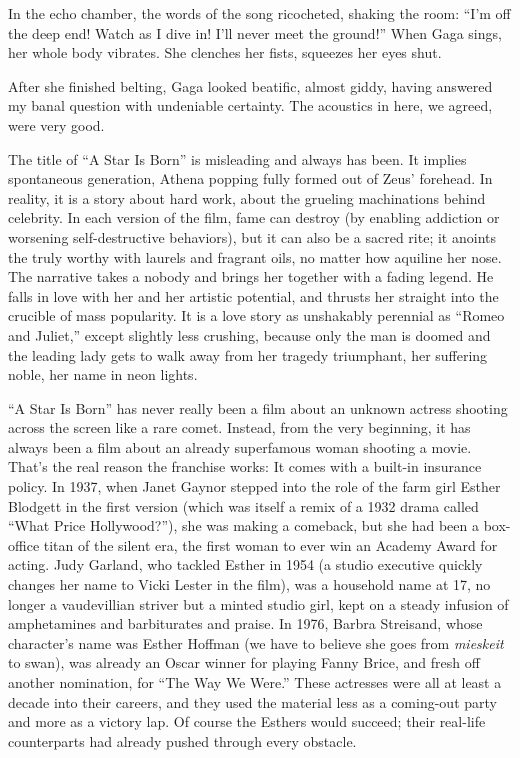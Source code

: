 In the echo chamber, the words of the song ricocheted, shaking the room:
``I'm off the deep end! Watch as I dive in! I'll never meet the
ground!'' When Gaga sings, her whole body vibrates. She clenches her
fists, squeezes her eyes shut.

After she finished belting, Gaga looked beatific, almost giddy, having
answered my banal question with undeniable certainty. The acoustics in
here, we agreed, were very good.

The title of ``A Star Is Born'' is misleading and always has been. It
implies spontaneous generation, Athena popping fully formed out of Zeus'
forehead. In reality, it is a story about hard work, about the grueling
machinations behind celebrity. In each version of the film, fame can
destroy (by enabling addiction or worsening self-destructive behaviors),
but it can also be a sacred rite; it anoints the truly worthy with
laurels and fragrant oils, no matter how aquiline her nose. The
narrative takes a nobody and brings her together with a fading legend.
He falls in love with her and her artistic potential, and thrusts her
straight into the crucible of mass popularity. It is a love story as
unshakably perennial as ``Romeo and Juliet,'' except slightly less
crushing, because only the man is doomed and the leading lady gets to
walk away from her tragedy triumphant, her suffering noble, her name in
neon lights.

``A Star Is Born'' has never really been a film about an unknown actress
shooting across the screen like a rare comet. Instead, from the very
beginning, it has always been a film about an already superfamous woman
shooting a movie. That's the real reason the franchise works: It comes
with a built-in insurance policy. In 1937, when Janet Gaynor stepped
into the role of the farm girl Esther Blodgett in the first version
(which was itself a remix of a 1932 drama called ``What Price
Hollywood?''), she was making a comeback, but she had been a box-office
titan of the silent era, the first woman to ever win an Academy Award
for acting. Judy Garland, who tackled Esther in 1954 (a studio executive
quickly changes her name to Vicki Lester in the film), was a household
name at 17, no longer a vaudevillian striver but a minted studio girl,
kept on a steady infusion of amphetamines and barbiturates and praise.
In 1976, Barbra Streisand, whose character's name was Esther Hoffman (we
have to believe she goes from \emph{mieskeit} to swan), was already an
Oscar winner for playing Fanny Brice, and fresh off another nomination,
for ``The Way We Were.'' These actresses were all at least a decade into
their careers, and they used the material less as a coming-out party and
more as a victory lap. Of course the Esthers would succeed; their
real-life counterparts had already pushed through every obstacle.

